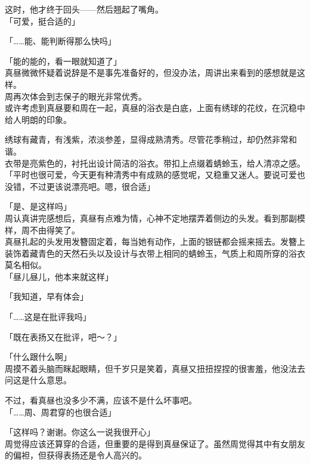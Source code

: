 这时，他才终于回头——然后翘起了嘴角。\\

「可爱，挺合适的」

「……能、能判断得那么快吗」

「能的能的，看一眼就知道了」\\

真昼微微怀疑着说辞是不是事先准备好的，但没办法，周讲出来看到的感想就是这样。\\

周再次体会到志保子的眼光非常优秀。\\

或许考虑到真昼要和周在一起，真昼的浴衣是白底，上面有绣球的花纹，在沉稳中给人明朗的印象。

绣球有藏青，有浅紫，浓淡参差，显得成熟清秀。尽管花季稍过，却仍然非常和谐。\\

衣带是亮紫色的，衬托出设计简洁的浴衣。带扣上点缀着蜻蛉玉，给人清凉之感。\\

「平时也很可爱，今天更有种清秀中有成熟的感觉呢，又稳重又迷人。要说可爱也没错，不过更该说漂亮吧。嗯，很合适」

「是、是这样吗」\\

周认真讲完感想后，真昼有点难为情，心神不定地摆弄着侧边的头发。看到那副模样，周不由得笑了。\\

真昼扎起的头发用发簪固定着，每当她有动作，上面的银链都会摇来摇去。发簪上装饰着藏青色的天然石头以及设计与衣带上相同的蜻蛉玉，气质上和周所穿的浴衣莫名相似。\\

「昼儿昼儿，他本来就这样」

「我知道，早有体会」

「……这是在批评我吗」

「既在表扬又在批评，吧～？」

「什么跟什么啊」\\

周摸不着头脑而眯起眼睛，但千岁只是笑着，真昼又扭扭捏捏的很害羞，他没法去问这是什么意思。

不过，看真昼也没多少不满，应该不是什么坏事吧。\\

「……周、周君穿的也很合适」

「这样吗？谢谢。你这么一说我很开心」\\

周觉得应该还算穿的合适，但重要的是得到真昼保证了。虽然周觉得其中有女朋友的偏袒，但获得表扬还是令人高兴的。\\

